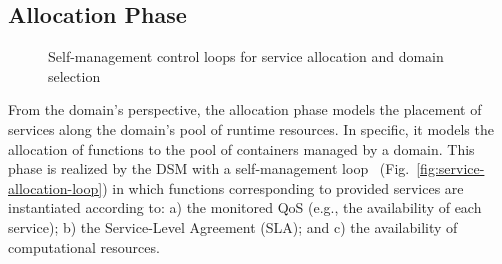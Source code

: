
\subsection*{Allocation Phase}\label{sec:A3-E-allocation}

\begin{figure}[thbp]
	\centering
	\captionsetup[subfigure]{width=0.4\textwidth}	
	\null\hfill
	\captionsetup[subfigure]{width=0.4\textwidth}	
	\hfill
	\hfill\null
	\caption{Self-management control loops for service allocation and domain selection}\label{fig:allocation-loops}
\end{figure}

From the domain's perspective, the allocation phase models the placement of services along the domain's pool of runtime resources. In specific, it models the allocation of functions to the pool of containers managed by a domain. 
This phase is realized by the DSM with a self-management loop~\cite{kephart2003vision} (Fig.~\ref{fig:service-allocation-loop}) in which functions corresponding to provided services are instantiated according to: a) the monitored QoS (e.g., the availability of each service); b) the Service-Level Agreement (SLA); and c) the availability of computational resources. 

